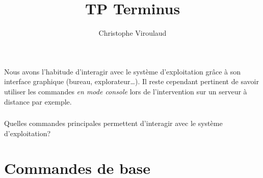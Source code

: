 \documentclass[svgnames,11pt]{beamer}
\author[]{Christophe Viroulaud}
\title{TP Terminus}
\date{\framebox{\textbf{ArchMat 10}}}
\institute{Première - NSI}
\begin{document}
\begin{frame}
\titlepage
\end{frame}
\begin{frame}
    \frametitle{}

    Nous avons l'habitude d'interagir avec le système d'exploitation grâce à son interface graphique (bureau, explorateur\dots). Il reste cependant pertinent de savoir utiliser les commandes \emph{en mode console} lors de l'intervention sur un serveur à distance par exemple.

\end{frame}
\begin{frame}
    \frametitle{}

    \begin{framed}
        \centering Quelles commandes principales permettent d'interagir avec le système d'exploitation?
    \end{framed}

\end{frame}
\section{Commandes de base}
\end{document}
